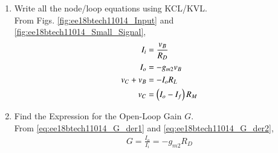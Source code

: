 \begin{enumerate}[label=\thesection.\arabic*.,ref=\thesection.\theenumi]
%
\item Write all the node/loop equations using KCL/KVL.
\\
\solution From Figs. 	\ref{fig:ee18btech11014_Input} and 	\ref{fig:ee18btech11014_Small_Signal},
%
\begin{align}
\label{eq:ee18btech11014_G_der1}
I_i &= \frac{v_B}{R_D}
\\
\label{eq:ee18btech11014_G_der2}
I_o &= -g_{m2}v_{B}
\\
\label{eq:ee18btech11014_H_der1}
v_{C} + v_{B} &= -I_oR_L
\\
\label{eq:ee18btech11014_H_der2}
v_C &= \left(I_o - I_f\right)R_M
\end{align}
%

\item Find the Expression for the Open-Loop Gain $G$.
\\
\solution From \eqref{eq:ee18btech11014_G_der1} and \eqref{eq:ee18btech11014_G_der2},
%
\begin{align}
\label{eq:ee18btech11014_G}
G=\frac{I_{o}}{I_{i}} = -g_{m2}R_D
\end{align}



\end{enumerate}
